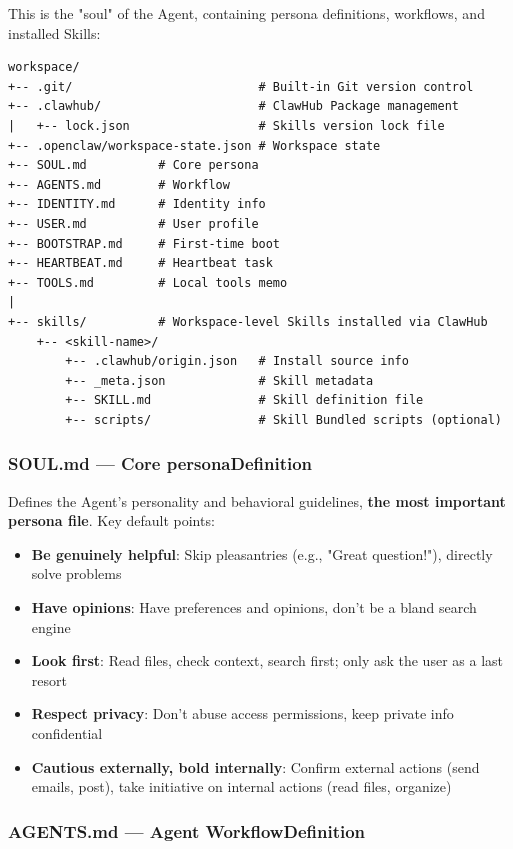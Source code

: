 This is the "soul" of the Agent, containing persona definitions, workflows, and installed Skills:

\begin{lstlisting}
workspace/
+-- .git/                          # Built-in Git version control
+-- .clawhub/                      # ClawHub Package management
|   +-- lock.json                  # Skills version lock file
+-- .openclaw/workspace-state.json # Workspace state
+-- SOUL.md          # Core persona
+-- AGENTS.md        # Workflow
+-- IDENTITY.md      # Identity info
+-- USER.md          # User profile
+-- BOOTSTRAP.md     # First-time boot
+-- HEARTBEAT.md     # Heartbeat task
+-- TOOLS.md         # Local tools memo
|
+-- skills/          # Workspace-level Skills installed via ClawHub
    +-- <skill-name>/
        +-- .clawhub/origin.json   # Install source info
        +-- _meta.json             # Skill metadata
        +-- SKILL.md               # Skill definition file
        +-- scripts/               # Skill Bundled scripts (optional)
\end{lstlisting}

\subsubsection{SOUL.md --- Core personaDefinition}


Defines the Agent's personality and behavioral guidelines, \textbf{the most important persona file}. Key default points:

\begin{itemize}
  \item \textbf{Be genuinely helpful}: Skip pleasantries (e.g., "Great question!"), directly solve problems
  \item \textbf{Have opinions}: Have preferences and opinions, don't be a bland search engine
  \item \textbf{Look first}: Read files, check context, search first; only ask the user as a last resort
  \item \textbf{Respect privacy}: Don't abuse access permissions, keep private info confidential
  \item \textbf{Cautious externally, bold internally}: Confirm external actions (send emails, post), take initiative on internal actions (read files, organize)
\end{itemize}

\subsubsection{AGENTS.md --- Agent WorkflowDefinition}


